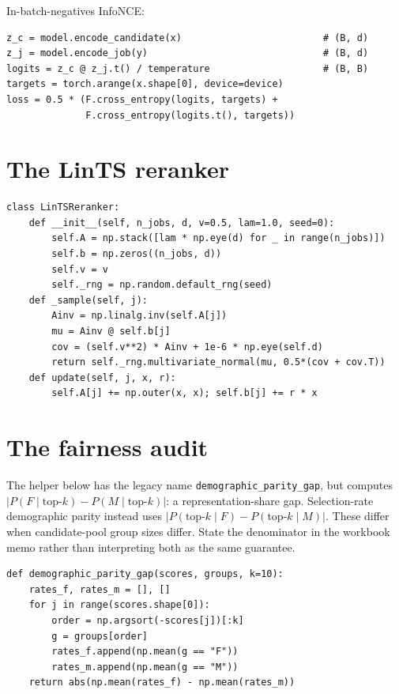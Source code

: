 \documentclass[11pt,oneside]{scrbook}
\begin{document}
In-batch-negatives InfoNCE:

\begin{verbatim}
z_c = model.encode_candidate(x)                         # (B, d)
z_j = model.encode_job(y)                               # (B, d)
logits = z_c @ z_j.t() / temperature                    # (B, B)
targets = torch.arange(x.shape[0], device=device)
loss = 0.5 * (F.cross_entropy(logits, targets) +
              F.cross_entropy(logits.t(), targets))
\end{verbatim}

\section{The LinTS reranker}

\begin{verbatim}
class LinTSReranker:
    def __init__(self, n_jobs, d, v=0.5, lam=1.0, seed=0):
        self.A = np.stack([lam * np.eye(d) for _ in range(n_jobs)])
        self.b = np.zeros((n_jobs, d))
        self.v = v
        self._rng = np.random.default_rng(seed)
    def _sample(self, j):
        Ainv = np.linalg.inv(self.A[j])
        mu = Ainv @ self.b[j]
        cov = (self.v**2) * Ainv + 1e-6 * np.eye(self.d)
        return self._rng.multivariate_normal(mu, 0.5*(cov + cov.T))
    def update(self, j, x, r):
        self.A[j] += np.outer(x, x); self.b[j] += r * x
\end{verbatim}

\section{The fairness audit}

\begin{remark}
The helper below has the legacy name \texttt{demographic\_parity\_gap},
but computes $|P(F\mid\mathrm{top}\mbox{-}k)-P(M\mid\mathrm{top}\mbox{-}k)|$:
a representation-share gap. Selection-rate demographic parity instead uses
$|P(\mathrm{top}\mbox{-}k\mid F)-P(\mathrm{top}\mbox{-}k\mid M)|$.
These differ when candidate-pool group sizes differ. State the denominator
in the workbook memo rather than interpreting both as the same guarantee.
\end{remark}


\begin{verbatim}
def demographic_parity_gap(scores, groups, k=10):
    rates_f, rates_m = [], []
    for j in range(scores.shape[0]):
        order = np.argsort(-scores[j])[:k]
        g = groups[order]
        rates_f.append(np.mean(g == "F"))
        rates_m.append(np.mean(g == "M"))
    return abs(np.mean(rates_f) - np.mean(rates_m))
\end{verbatim}
\end{document}
